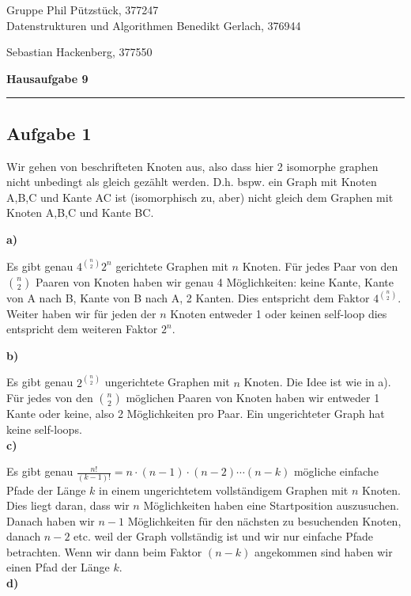 \documentclass[a4paper,graphics,11pt]{article}
\newcommand{\aufgabe}[1]{\subsection*{Aufgabe #1}}
\begin{document}
\noindent Gruppe              \hfill Phil Pützstück, 377247\\
\noindent Datenstrukturen und Algorithmen \hfill Benedikt Gerlach, 376944\\
\strut\hfill Sebastian Hackenberg, 377550\\
\begin{center}
	\LARGE{\textbf{Hausaufgabe 9}}
\end{center}
\begin{center}
\rule[0.1ex]{\textwidth}{1pt}
\end{center}

\aufgabe{1}
Wir gehen von beschrifteten Knoten aus, also dass hier 2 isomorphe graphen nicht unbedingt als gleich gezählt werden.
D.h. bspw. ein Graph mit Knoten A,B,C und Kante AC ist (isomorphisch zu, aber) nicht gleich dem Graphen mit Knoten A,B,C und Kante BC.

\textbf{a)}

Es gibt genau $4^{\binom{n}{2}}2^n$ gerichtete Graphen mit $n$ Knoten. Für jedes Paar von den $\binom{n}{2}$ Paaren
von Knoten haben wir genau 4 Möglichkeiten: keine Kante, Kante von A nach B, Kante von B nach A, 2 Kanten.
Dies entspricht dem Faktor $4^{\binom{n}{2}}$.
Weiter haben wir für jeden der $n$ Knoten entweder 1 oder keinen self-loop dies entspricht dem weiteren Faktor $2^n$.

\textbf{b)}

Es gibt genau $2^{\binom{n}{2}}$ ungerichtete Graphen mit $n$ Knoten. Die Idee ist wie in a). Für jedes von
den $\binom{n}{2}$ möglichen Paaren von Knoten haben wir entweder 1 Kante oder keine, also 2 Möglichkeiten
pro Paar. Ein ungerichteter Graph hat keine self-loops.\\

\textbf{c)}

Es gibt genau $\frac{n!}{(k-1)!} = n \cdot (n-1) \cdot (n-2) \cdots (n-k)$ mögliche einfache Pfade der Länge
$k$ in einem ungerichtetem vollständigem Graphen mit $n$ Knoten. Dies liegt daran, dass wir $n$ Möglichkeiten
haben eine Startposition auszusuchen. Danach haben wir $n-1$ Möglichkeiten für den nächsten zu besuchenden
Knoten, danach $n-2$ etc. weil der Graph vollständig ist und wir nur einfache Pfade betrachten. Wenn wir
dann beim Faktor $(n-k)$ angekommen sind haben wir einen Pfad der Länge $k$.\\

\textbf{d)}
\end{document}
